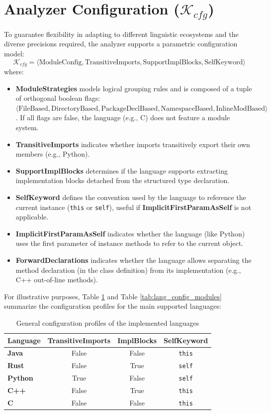 \section{Analyzer Configuration ($\mathcal{K}_{cfg}$)}
To guarantee flexibility in adapting to different linguistic
ecosystems and the diverse precisions required, the analyzer supports
a parametric configuration model:
$$\mathcal{K}_{cfg} = \langle \text{ModuleConfig},
\text{TransitiveImports}, \text{SupportImplBlocks}, \text{SelfKeyword} \rangle$$
where:
\begin{itemize}
  \item \textbf{ModuleStrategies} models logical grouping rules and
    is composed of a tuple of orthogonal boolean flags: $\langle
    \text{FileBased}, \text{DirectoryBased}, \text{PackageDeclBased},
    \text{NamespaceBased}, \text{InlineModBased} \rangle$. If all
    flags are false, the language (e.g., C) does not feature a module system.
  \item \textbf{TransitiveImports} indicates whether imports
    transitively export their own members (e.g., Python).
  \item \textbf{SupportImplBlocks} determines if the language
    supports extracting implementation blocks detached from the
    structured type declaration.
  \item \textbf{SelfKeyword} defines the convention used by the
    language to reference the current instance (\texttt{this} or
    \texttt{self}), useful if \textbf{ImplicitFirstParamAsSelf} is
    not applicable.
  \item \textbf{ImplicitFirstParamAsSelf} indicates whether the
    language (like Python) uses the first parameter of instance
    methods to refer to the current object.
  \item \textbf{ForwardDeclarations} indicates whether the language
    allows separating the method declaration (in the class
    definition) from its implementation (e.g., C++ out-of-line methods).
\end{itemize}

For illustrative purposes, Table \ref{tab:lang_config_general} and
Table \ref{tab:lang_config_modules} summarize the configuration
profiles for the main supported languages:

\begin{table}[h]
  \centering
  \begin{tabular}{|l|c|c|c|}
    \hline
    \textbf{Language} & \textbf{TransitiveImports} &
    \textbf{ImplBlocks} & \textbf{SelfKeyword} \\ \hline
    \textbf{Java} & False & False & \texttt{this} \\ \hline
    \textbf{Rust} & False & True & \texttt{self} \\ \hline
    \textbf{Python} & True & False & \texttt{self} \\ \hline
    \textbf{C++} & False & True & \texttt{this} \\ \hline
    \textbf{C} & False & False & \texttt{this} \\ \hline
  \end{tabular}
  \caption{General configuration profiles of the implemented languages}
  \label{tab:lang_config_general}
\end{table}

